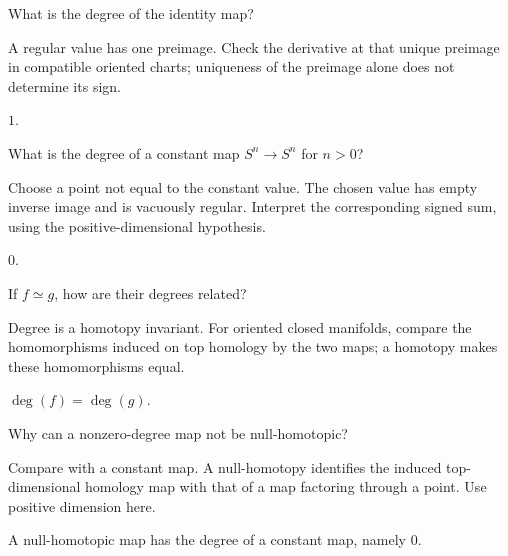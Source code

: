 \begin{exercise}\label{exr:viii03-03}
What is the degree of the identity map?
\end{exercise}
\begin{hint}A regular value has one preimage.
Check the derivative at that unique preimage in compatible oriented charts; uniqueness of the preimage alone does not determine its sign.
\end{hint}
\begin{solution}
\(1\).
\end{solution}

\begin{exercise}\label{exr:viii03-04}
What is the degree of a constant map \(S^n\to S^n\) for \(n>0\)?
\end{exercise}
\begin{hint}Choose a point not equal to the constant value.
The chosen value has empty inverse image and is vacuously regular. Interpret the corresponding signed sum, using the positive-dimensional hypothesis.
\end{hint}
\begin{solution}
\(0\).
\end{solution}

\begin{exercise}\label{exr:viii03-05}
If \(f\simeq g\), how are their degrees related?
\end{exercise}
\begin{hint}Degree is a homotopy invariant.
For oriented closed manifolds, compare the homomorphisms induced on top homology by the two maps; a homotopy makes these homomorphisms equal.
\end{hint}
\begin{solution}
\(\deg(f)=\deg(g)\).
\end{solution}

\begin{exercise}\label{exr:viii03-06}
Why can a nonzero-degree map not be null-homotopic?
\end{exercise}
\begin{hint}Compare with a constant map.
A null-homotopy identifies the induced top-dimensional homology map with that of a map factoring through a point. Use positive dimension here.
\end{hint}
\begin{solution}
A null-homotopic map has the degree of a constant map, namely \(0\).
\end{solution}

